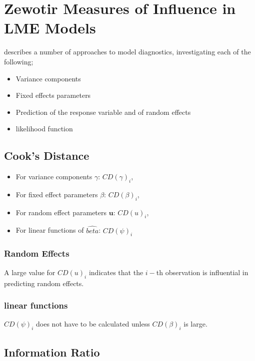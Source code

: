 \documentclass[12pt, a4paper]{article}
\begin{document}
\section{Zewotir Measures of Influence in LME Models}%
\citet{Zewotir} describes a number of approaches to model diagnostics, investigating each of the following;
\begin{itemize}
	\item Variance components
	\item Fixed effects parameters
	\item Prediction of the response variable and of random effects
	\item likelihood function
\end{itemize}

\subsection{Cook's Distance}
\begin{itemize}
	\item For variance components $\gamma$: $CD(\gamma)_i$,
	\item For fixed effect parameters $\beta$: $CD(\beta)_i$,
	\item For random effect parameters $\boldsymbol{u}$: $CD(u)_i$,
	\item For linear functions of $\hat{beta}$: $CD(\psi)_i$
\end{itemize}

\newpage
\subsubsection{Random Effects}

A large value for $CD(u)_i$ indicates that the $i-$th observation is influential in predicting random effects.

\subsubsection{linear functions}

$CD(\psi)_i$ does not have to be calculated unless $CD(\beta)_i$ is large.


\subsection{Information Ratio}


\newpage
\end{document}
